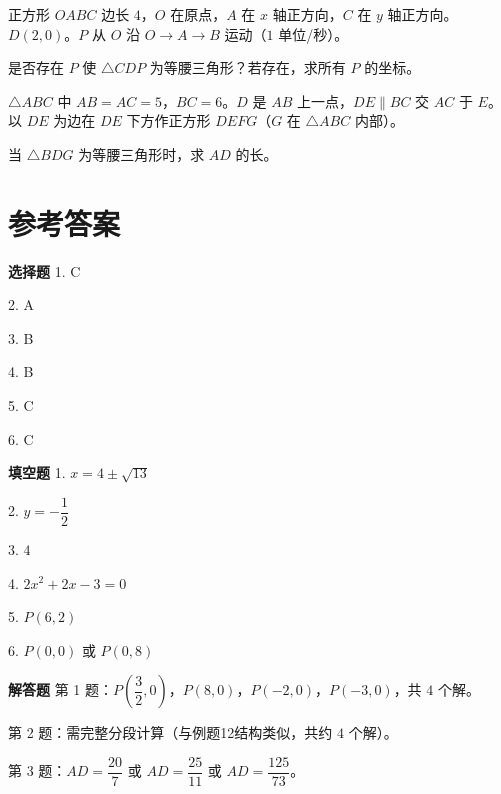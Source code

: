 \documentclass{exam-zh}
\newcommand{\answerarea}[1][40mm]{%
  \vspace{2mm}%
  \begin{tcolorbox}[
    enhanced, breakable,
    colback=white,
    colframe=white,
    boxrule=0pt,
    height=#1,
    valign=top,
    bottom=0mm,
    after skip=0mm,
  ]
  \end{tcolorbox}%
}
\begin{document}
\begin{problem}[points=10]
  正方形 $OABC$ 边长 $4$，$O$ 在原点，$A$ 在 $x$ 轴正方向，$C$ 在 $y$ 轴正方向。$D(2,0)$。$P$ 从 $O$ 沿 $O \to A \to B$ 运动（$1$ 单位/秒）。

是否存在 $P$ 使 $\triangle CDP$ 为等腰三角形？若存在，求所有 $P$ 的坐标。
  \answerarea[80mm]
\end{problem}



\begin{problem}[points=10]
  $\triangle ABC$ 中 $AB=AC=5$，$BC=6$。$D$ 是 $AB$ 上一点，$DE \parallel BC$ 交 $AC$ 于 $E$。以 $DE$ 为边在 $DE$ 下方作正方形 $DEFG$（$G$ 在 $\triangle ABC$ 内部）。

当 $\triangle BDG$ 为等腰三角形时，求 $AD$ 的长。
  \answerarea[80mm]
\end{problem}


\clearpage
\section*{参考答案}


\begin{keyideabox}
  \textbf{选择题}
  1. C

2. A

3. B

4. B

5. C

6. C
\end{keyideabox}



\begin{keyideabox}
  \textbf{填空题}
  1. $x=4\pm\sqrt{13}$

2. $y=-\dfrac{1}{2}$

3. $4$

4. $2x^2+2x-3=0$

5. $P(6,2)$

6. $P(0,0)$ 或 $P(0,8)$
\end{keyideabox}



\begin{keyideabox}
  \textbf{解答题}
  第 1 题：$P\left(\dfrac{3}{2},0\right)$，$P(8,0)$，$P(-2,0)$，$P(-3,0)$，共 $4$ 个解。

第 2 题：需完整分段计算（与例题12结构类似，共约 $4$ 个解）。

第 3 题：$AD = \dfrac{20}{7}$ 或 $AD = \dfrac{25}{11}$ 或 $AD = \dfrac{125}{73}$。
\end{keyideabox}
\end{document}
